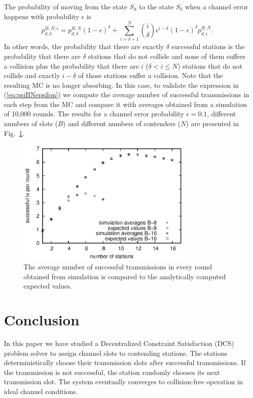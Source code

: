 \documentclass[journal]{IEEEtran}
\begin{document}
The probability of moving from the state $S_d$ to the state $S_\delta$ when a channel error happens with probability $\epsilon$ is
\begin{equation}
\label{eq:psiBNepsilon}
p^{B,N,\epsilon}_{d,\delta}= p^{B,N}_{d,\delta} (1-\epsilon)^\delta + \sum_{i=\delta+1}^{N} \binom{i}{\delta} \epsilon^{i-\delta}(1-\epsilon)^\delta p^{B,N}_{d,i}.
\end{equation}
In other words, the probability that there are exactly $\delta$ successful stations is the probability that there are $\delta$ stations that do not collide and none of them suffers a collision plus the probability that there are $i$ ($\delta < i \leq N$) stations that do not collide and exactly $i-\delta$ of those stations suffer a collision.
Note that the resulting MC is no longer absorbing.
In this case, to validate the expression in (\ref{eq:psiBNepsilon}) we compute the average number of successful transmissions in each step from the MC and compare it with averages obtained from a simulation of 10,000 rounds.
The results for a channel error probability $\epsilon=0.1$, different numbers of slots ($B$) and different numbers of contenders ($N$) are presented in Fig.~\ref{fig:successful_tx_per_step}.

\begin{figure}[h]
\centering
\includegraphics[height=6.2cm]{figures/successful_tx_per_step}
\caption{The average number of successful transmissions in every round obtained from simulation is compared to the analytically computed expected values.}
\label{fig:successful_tx_per_step}
\end{figure}

\section{Conclusion}
\label{sec:conclusion}

In this paper we have studied a Decentralized Constraint Satisfaction (DCS) problem solver to assign channel slots to contending stations.
The stations deterministically choose their transmission slots after successful transmissions.
If the transmission is not successful, the station randomly chooses its next transmission slot.
The system eventually converges to collision-free operation in ideal channel conditions.
\end{document}
